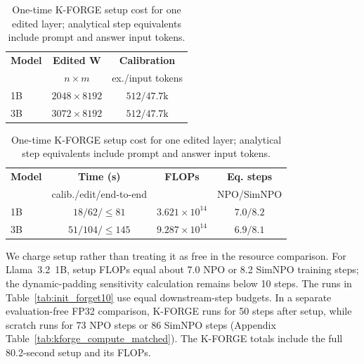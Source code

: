\documentclass[11pt]{article}
\begin{document}
\begin{table}[t]
\centering
\small
\setlength{\tabcolsep}{2pt}
\begin{tabular}{lcc}
\toprule
\textbf{Model} & \textbf{Edited $\mathbf{W}$} & \textbf{Calibration} \\
 & $n{\times}m$ & ex./input tokens \\
\midrule
1B & $2048{\times}8192$ & $512/47.7\mathrm{k}$ \\
3B & $3072{\times}8192$ & $512/47.7\mathrm{k}$ \\
\bottomrule
\end{tabular}
\par\smallskip
\begin{tabular}{lccc}
\toprule
\textbf{Model} & \textbf{Time (s)} & \textbf{FLOPs} & \textbf{Eq. steps} \\
 & calib./edit/end-to-end & & NPO/SimNPO \\
\midrule
1B & $18/62/{\leq}81$ & $3.621{\times}10^{14}$ & $7.0/8.2$ \\
3B & $51/104/{\leq}145$ & $9.287{\times}10^{14}$ & $6.9/8.1$ \\
\bottomrule
\end{tabular}
\caption{One-time K-FORGE setup cost for one edited layer; analytical step equivalents include prompt and answer input tokens.}
\label{tab:kforge_compute}
\end{table}

We charge setup rather than treating it as free in the resource comparison.
For Llama~3.2~1B, setup FLOPs equal about 7.0 NPO or 8.2 SimNPO training steps; the dynamic-padding sensitivity calculation remains below 10 steps.
The runs in Table~\ref{tab:init_forget10} use equal downstream-step budgets.
In a separate evaluation-free FP32 comparison, K-FORGE runs for 50 steps after setup, while scratch runs for 73 NPO steps or 86 SimNPO steps (Appendix Table~\ref{tab:kforge_compute_matched}).
The K-FORGE totals include the full 80.2-second setup and its FLOPs.
\end{document}
